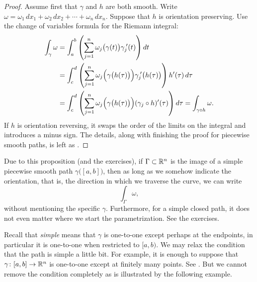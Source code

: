 \begin{proof}
Assume first that $\gamma$ and $h$ are both smooth.
Write $\omega = \omega_1 \, dx_1 + \omega_2 \, dx_2 + \cdots +
\omega_n \, dx_n$.
Suppose that $h$ is orientation preserving.  Use
the change of variables formula for the Riemann integral:
\begin{equation*}
\begin{split}
\int_{\gamma} \omega
& =
\int_a^b 
\left(
\sum_{j=1}^n
\omega_j\bigl(\gamma(t)\bigr) \gamma_j^{\:\prime}(t)
\right) dt
\\
& =
\int_c^d 
\left(
\sum_{j=1}^n
\omega_j\Bigl(\gamma\bigl(h(\tau)\bigr)\Bigr) \gamma_j^{\:\prime}\bigl(h(\tau)\bigr)
\right) h'(\tau) \, d\tau
\\
& =
\int_c^d 
\left(
\sum_{j=1}^n
\omega_j\Bigl(\gamma\bigl(h(\tau)\bigr)\Bigr) (\gamma_j \circ h)'(\tau)
\right) d\tau
=
\int_{\gamma \circ h} \omega .
\end{split}
\end{equation*}
If $h$ is orientation reversing, it swaps the order of the limits on the
integral and introduces a minus sign.
The details, along with finishing the proof for piecewise smooth
paths, is left as .
\end{proof}

Due to this proposition (and the exercises), if $\Gamma
\subset {\mathbb{R}}^n$ is the image of a simple piecewise smooth path
$\gamma\bigl([a,b]\bigr)$, then as long as we somehow indicate the orientation, that
is, the direction in which we traverse the curve, we can write
\begin{equation*}
\int_{\Gamma} \omega ,
\end{equation*}
without mentioning the specific $\gamma$.
Furthermore, for a simple closed path, it does not even matter where we
start the parametrization.  See the exercises.

Recall that \emph{simple} means that $\gamma$
is one-to-one except perhaps at the endpoints, in particular
it is one-to-one when restricted to $[a,b)$.
We may relax the condition that the path is simple a little bit.
For example, it is enough to suppose that
$\gamma \colon [a,b] \to {\mathbb{R}}^n$ is one-to-one except at finitely many points.
See .  But we cannot remove
the condition completely as is
illustrated by the following example.

